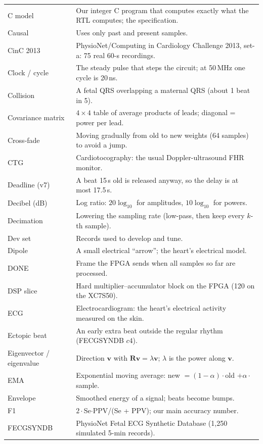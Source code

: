 \documentclass[11pt]{article}
\begin{document}
{\begin{longtable}{@{}p{3.4cm} p{12.0cm}@{}}
C model & Our integer C program that computes exactly what the RTL computes; the specification. \\
Causal & Uses only past and present samples. \\
CinC 2013 & PhysioNet/Computing in Cardiology Challenge 2013, set-a: 75 real 60-s recordings. \\
Clock / cycle & The steady pulse that steps the circuit; at 50\,MHz one cycle is 20\,ns. \\
Collision & A fetal QRS overlapping a maternal QRS (about 1 beat in 5). \\
Covariance matrix & $4\times4$ table of average products of leads; diagonal = power per lead. \\
Cross-fade & Moving gradually from old to new weights (64 samples) to avoid a jump. \\
CTG & Cardiotocography: the usual Doppler-ultrasound FHR monitor. \\
Deadline (v7) & A beat 15\,s old is released anyway, so the delay is at most 17.5\,s. \\
Decibel (dB) & Log ratio: $20\log_{10}$ for amplitudes, $10\log_{10}$ for powers. \\
Decimation & Lowering the sampling rate (low-pass, then keep every $k$-th sample). \\
Dev set & Records used to develop and tune. \\
Dipole & A small electrical ``arrow''; the heart's electrical model. \\
DONE & Frame the FPGA sends when all samples so far are processed. \\
DSP slice & Hard multiplier--accumulator block on the FPGA (120 on the XC7S50). \\
ECG & Electrocardiogram: the heart's electrical activity measured on the skin. \\
Ectopic beat & An early extra beat outside the regular rhythm (FECGSYNDB $c4$). \\
Eigenvector / eigenvalue & Direction $\mathbf{v}$ with $\mathbf{R}\mathbf{v} = \lambda\mathbf{v}$; $\lambda$ is the power along $\mathbf{v}$. \\
EMA & Exponential moving average: new $= (1-\alpha)\cdot$old $+ \alpha\cdot$sample. \\
Envelope & Smoothed energy of a signal; beats become bumps. \\
F1 & $2\cdot$Se$\cdot$PPV/(Se + PPV); our main accuracy number. \\
FECGSYNDB & PhysioNet Fetal ECG Synthetic Database (1,250 simulated 5-min records). \\

\end{longtable}}
\end{document}
